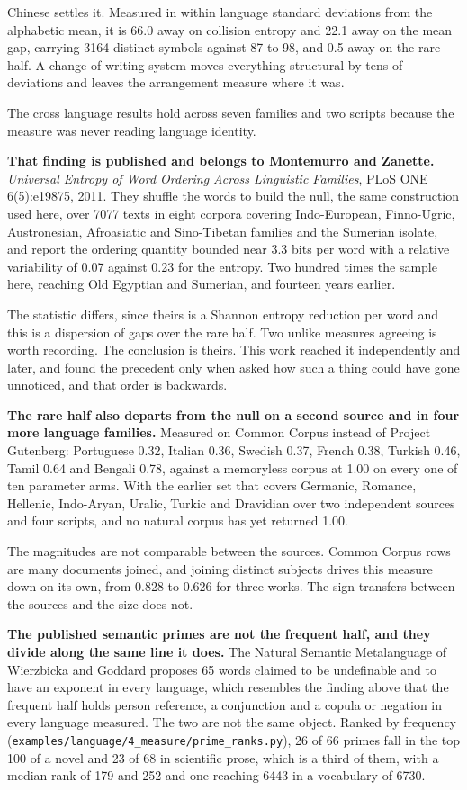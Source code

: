 Chinese settles it. Measured in within language standard deviations from the alphabetic mean, it is 66.0 away on collision entropy and 22.1 away on the mean gap, carrying 3164 distinct symbols against 87 to 98, and 0.5 away on the rare half. A change of writing system moves everything structural by tens of deviations and leaves the arrangement measure where it was.

The cross language results hold across seven families and two scripts because the measure was never reading language identity.

\textbf{That finding is published and belongs to Montemurro and Zanette.} \emph{Universal Entropy of Word Ordering Across Linguistic Families}, PLoS ONE 6(5):e19875, 2011. They shuffle the words to build the null, the same construction used here, over 7077 texts in eight corpora covering Indo-European, Finno-Ugric, Austronesian, Afroasiatic and Sino-Tibetan families and the Sumerian isolate, and report the ordering quantity bounded near 3.3 bits per word with a relative variability of 0.07 against 0.23 for the entropy. Two hundred times the sample here, reaching Old Egyptian and Sumerian, and fourteen years earlier.

The statistic differs, since theirs is a Shannon entropy reduction per word and this is a dispersion of gaps over the rare half. Two unlike measures agreeing is worth recording. The conclusion is theirs. This work reached it independently and later, and found the precedent only when asked how such a thing could have gone unnoticed, and that order is backwards.

\textbf{The rare half also departs from the null on a second source and in four more language families.} Measured on Common Corpus instead of Project Gutenberg: Portuguese 0.32, Italian 0.36, Swedish 0.37, French 0.38, Turkish 0.46, Tamil 0.64 and Bengali 0.78, against a memoryless corpus at 1.00 on every one of ten parameter arms. With the earlier set that covers Germanic, Romance, Hellenic, Indo-Aryan, Uralic, Turkic and Dravidian over two independent sources and four scripts, and no natural corpus has yet returned 1.00.

The magnitudes are not comparable between the sources. Common Corpus rows are many documents joined, and joining distinct subjects drives this measure down on its own, from 0.828 to 0.626 for three works. The sign transfers between the sources and the size does not.

\textbf{The published semantic primes are not the frequent half, and they divide along the same line it does.} The Natural Semantic Metalanguage of Wierzbicka and Goddard proposes 65 words claimed to be undefinable and to have an exponent in every language, which resembles the finding above that the frequent half holds person reference, a conjunction and a copula or negation in every language measured. The two are not the same object. Ranked by frequency (\texttt{examples/\allowbreak{}language/\allowbreak{}4\_\allowbreak{}measure/\allowbreak{}prime\_\allowbreak{}ranks.\allowbreak{}py}), 26 of 66 primes fall in the top 100 of a novel and 23 of 68 in scientific prose, which is a third of them, with a median rank of 179 and 252 and one reaching 6443 in a vocabulary of 6730.


